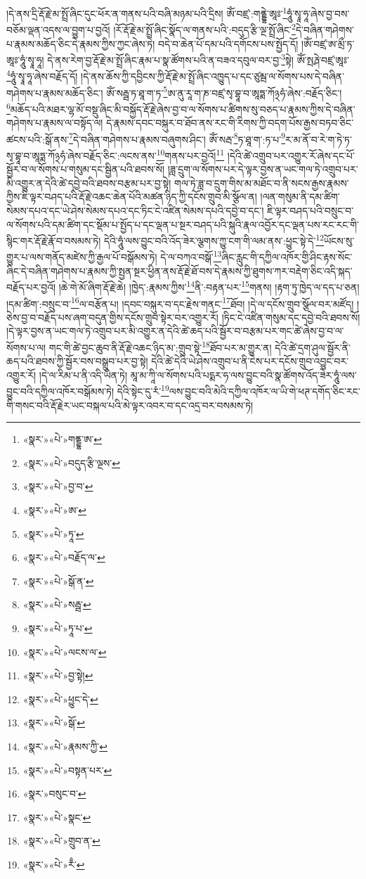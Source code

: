 །དེ་ནས་དྲི་རྡོ་རྗེ་མ་སྤྲོ་ཞིང་དུང་ཕོར་ན་གནས་པའི་བཞི་མཉམ་པའི་དྲིས། ཨོཾ་བཛྲ་:གནྡྷེ་ཨཱཿ་\footnote{«སྣར་»«པེ་»གནྡྷ་ཨ་}ཧཱུཾ་སྭཱ་ཧཱ་ཞེས་བྱ་བས་བཅོམ་ལྡན་འདས་ལ་བྱུག་པ་བྱའོ། །རོ་རྡོ་རྗེ་མ་སྤྲོ་ཞིང་སྣོད་ལ་གནས་པའི་:བདུད་རྩི་ལྔ་སྤྲོ་ཞིང་\footnote{«སྣར་»«པེ་»བདུད་རྩི་ལྔས་}དེ་བཞིན་གཤེགས་པ་རྣམས་མཆོད་ཅིང་དེ་རྣམས་ཀྱིས་ཀྱང་ཞེས་ཏེ། བདེ་བ་ཆེན་པོ་དམ་པའི་དགོངས་པས་སྤྱོད་དོ། །ཨོཾ་བཛྲ་ཨ་མྲྀ་ཏ་ཨཱཿ་ཧཱུཾ་སྭཱ་ཧཱ། དེ་ནས་རེག་བྱ་རྡོ་རྗེ་མ་སྤྲོ་ཞིང་རྣམ་པ་སྣ་ཚོགས་པའི་ན་བཟའ་དབུལ་བར་བྱ་\footnote{«སྣར་»«པེ་»བྱ་བ་}སྟེ། ཨོཾ་སྤརྴེ་བཛྲ་ཨཱཿ་\footnote{«སྣར་»«པེ་»ཨ་}ཧཱུཾ་སྭཱ་ཧཱ་ཞེས་བརྗོད་དོ། །དེ་ནས་ཆོས་ཀྱི་དབྱིངས་ཀྱི་རྡོ་རྗེ་མ་སྤྲོ་ཞིང་འཁྱུད་པ་དང་ཙུམྦ་ལ་སོགས་པས་དེ་བཞིན་གཤེགས་པ་རྣམས་མཆོད་ཅིང་། ཨོཾ་སརྦྦ་ཏ་ཐཱ་ག་ཏ་\footnote{«སྣར་»«པེ་»ཏཱ་}ཨ་ནུ་རཱ་ག་ཎ་བཛྲ་སྭ་བྷཱ་བ་ཨཱཏྨ་ཀོ྅ཧཾ་ཞེས་:བརྗོད་ཅིང་། \footnote{«སྣར་»«པེ་»བརྗོད་ལ་}མཆོད་པའི་མཐར་ལྷ་མོ་བསྡུ་ཞིང་མི་བསྐྱོད་རྡོ་རྗེ་ཞེས་བྱ་བ་ལ་སོགས་པ་ཚིགས་སུ་བཅད་པ་རྣམས་ཀྱིས་དེ་བཞིན་གཤེགས་པ་རྣམས་ལ་བསྟོད་ལ། དེ་རྣམས་དབང་བསྐུར་བ་ཐོབ་ནས་རང་གི་རིགས་ཀྱི་བདག་པོས་རྒྱས་བཏབ་ཅིང་ཚངས་པའི་:སྒོ་ནས་\footnote{«སྣར་»«པེ་»སྒོ་ན་}དེ་བཞིན་གཤེགས་པ་རྣམས་བཞུགས་ཤིང་། ཨོཾ་སརྦ་\footnote{«སྣར་»«པེ་»སརྦྦ་}ཏ་ཐཱ་ག་:ཏ་པ་\footnote{«སྣར་»«པེ་»ཏཱ་པ་}ར་མ་ནོ་བ་རེ་ག་ཏེ་ཏ་སྭ་བྷཱ་བ་ཨཱཏྨ་ཀོ྅ཧཾ་ཞེས་བརྗོད་ཅིང་:ལངས་ནས་\footnote{«སྣར་»«པེ་»ལངས་ལ་}གནས་པར་བྱའོ།\footnote{«སྣར་»«པེ་»བྱ་སྟེ།} །དེའི་ཚེ་འགྲུབ་པར་འགྱུར་རོ་ཞེས་དང་པོ་སྦྱོར་བ་ལ་སོགས་པ་གསུམ་དང་སྦྱིན་པའི་ཐབས་སོ། །ཟླ་དྲུག་ལ་སོགས་པར་དེ་ལྟར་བྱས་ན་ཡང་གལ་ཏེ་འགྲུབ་པར་མི་འགྱུར་ན་དེའི་ཚེ་དབྱེ་བའི་ཐབས་བརྩམ་པར་བྱ་སྟེ། གལ་ཏེ་ཟླ་བ་དྲུག་གིས་མ་མཐོང་བ་ནི་སངས་རྒྱས་རྣམས་ཀྱིས་ཇི་ལྟར་བཤད་པའི་རྡོ་རྗེ་འཆང་ཆེན་པོའི་མཚན་ཉིད་ཀྱི་དངོས་གྲུབ་མི་སྩོལ་ན། །ལན་གསུམ་ནི་དམ་ཚིག་སེམས་དཔའ་དང་ཡེ་ཤེས་སེམས་དཔའ་དང་ཏིང་ངེ་འཛིན་སེམས་དཔའི་དབྱེ་བ་དང་། ཇི་ལྟར་བཤད་པའི་བསྲུང་བ་ལ་སོགས་པའི་དམ་ཚིག་དང་སྡོམ་པ་སྤྱོད་པ་དང་ལྡན་པ་སྔར་བཤད་པའི་སྐུའི་རྣལ་འབྱོར་དང་ལྡན་པས་རང་རང་གི་སྙིང་གར་རྡོ་རྗེ་རྣོ་བ་བསམས་ཏེ། དེའི་ཧཱུཾ་ལས་བྱུང་བའི་འོད་ཟེར་ལྕགས་ཀྱུ་ངག་གི་ལམ་ནས་:ཕྱུང་སྟེ་དེ་\footnote{«སྣར་»«པེ་»ཕྱུང་དེ་}ཡོངས་སུ་གྱུར་པ་ལས་གནོད་མཛེས་ཀྱི་རྒྱལ་པོ་བསྒོམས་ཏེ། དེ་ལ་བཀའ་བསྒོ་\footnote{«སྣར་»«པེ་»སྒོ་}ཞིང་རླུང་གི་དཀྱིལ་འཁོར་གྱི་ཤིང་རྟས་སོང་ཞིང་དེ་བཞིན་གཤེགས་པ་རྣམས་ཀྱི་སྤྱན་སྔར་ཕྱིན་ནས་རྡོ་རྗེ་ཐོ་བས་དེ་རྣམས་ཀྱི་ཐུགས་ཀར་བརྡེག་ཅིང་འདི་སྐད་བརྗོད་པར་བྱའོ། །ཆེ་གེ་མོ་ཞིག་རྡོ་རྗེ་ཆེ། །ཁྱེད་:རྣམས་ཀྱིས་\footnote{«སྣར་»«པེ་»རྣམས་ཀྱི་}ནི་:བརྟན་པར་\footnote{«སྣར་»«པེ་»བསྟན་པར་}གནས། །རྟག་ཏུ་ཁྱེད་ལ་དད་པ་ཅན། །དམ་ཚིག་:བསྲུང་བ་\footnote{«སྣར་»བསུང་བ་}ལ་བརྩོན་པ། །དབང་བསྐུར་བ་དང་རྗེས་གནང་\footnote{«སྣར་»«པེ་»སྣང་}ཐོབ། །དེ་ལ་དངོས་གྲུབ་སྩོལ་བར་མཛོད། །ཅེས་བྱ་བ་བརྗོད་པས་ཞག་བདུན་གྱིས་དངོས་གྲུབ་སྟེར་བར་འགྱུར་རོ། །ཏིང་ངེ་འཛིན་གསུམ་དང་དབྱེ་བའི་ཐབས་སོ། །དེ་ལྟར་བྱས་ན་ཡང་གལ་ཏེ་འགྲུབ་པར་མི་འགྱུར་ན་དེའི་ཚེ་ཆད་པའི་སྦྱོར་བ་བརྩམ་པར་གང་ཚེ་ཞེས་བྱ་བ་ལ་སོགས་པ་ལ། གང་གི་ཚེ་བྱང་ཆུབ་ནི་རྡོ་རྗེ་འཆང་ཉིད་མ་:གྲུབ་སྟེ་\footnote{«སྣར་»«པེ་»གྲུབ་ན་}ཐོབ་པར་མ་གྱུར་ན། དེའི་ཚེ་དྲག་ཤུལ་སྦྱོར་ནི་ཆད་པའི་ཐབས་ཀྱི་སྦྱོར་བས་བསྒྲུབ་པར་བྱ་སྟེ། དེའི་ཚེ་དེའི་ཡེ་ཤེས་འགྲུབ་པ་ནི་ངེས་པར་དངོས་གྲུབ་འབྱུང་བར་འགྱུར་རོ། །དེ་ལ་རིམ་པ་ནི་འདི་ཡིན་ཏེ། མཱ་མ་ཀཱི་ལ་སོགས་པའི་པདྨར་ཧ་ལས་བྱུང་བའི་སྣ་ཚོགས་འོད་ཟེར་ཧཱུཾ་ལས་བྱུང་བའི་དཀྱིལ་འཁོར་བསྒོམས་ཏེ། དེའི་སྟེང་དུ་རཾ་\footnote{«སྣར་»«པེ་»རྃ་}ལས་བྱུང་བའི་མེའི་དཀྱིལ་འཁོར་ལ་ཡི་གེ་ཕཊ་དགོད་ཅིང་རང་གི་གསང་བའི་རྡོ་རྗེར་ཡང་བསྐལ་པའི་མེ་ལྟར་འབར་བ་དང་འདྲ་བར་བསམས་ཏེ། 